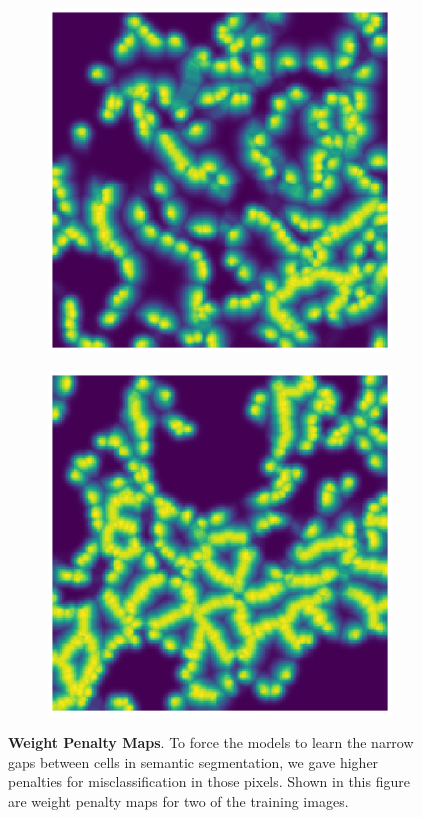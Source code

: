 \documentclass[journal]{IEEEtran}
\begin{document}
\begin{figure}
\centering
\begin{subfigure}[b]{0.45\linewidth}
\includegraphics[width=\linewidth]{weights/110082-wmap.eps}
\end{subfigure}
\begin{subfigure}[b]{0.45\linewidth}
\includegraphics[width=\linewidth]{weights/110115-wmap.eps}
\end{subfigure}
\caption{\textbf{Weight Penalty Maps}. To force the models to learn the narrow gaps between cells in semantic segmentation, we gave higher penalties for misclassification in those pixels. Shown in this figure are weight penalty maps for two of the training images.}
\label{fig:weight_map}
\end{figure}
\end{document}

